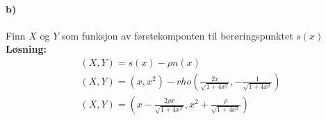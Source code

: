 \documentclass[11pt, A4paper,norsk]{article}
\begin{document}
		\paragraph{b)}
			\begin{flushleft}
Finn $X$ og $Y$ som funksjon av førstekomponten til berøringspunktet $s(x)$ \\
\vspace{1mm}
\textbf{Løsning:} \\
\vspace{1mm}
				\begin{align}
(X, Y) = s(x) - \rho n(x) \\
(X, Y) = (x, x^2) - rho (\frac{2x}{\sqrt{1 + 4x^2}}, - \frac{1}{\sqrt{1 + 4x^2}}) \\
(X, Y) = (x - \frac{2\rho x}{\sqrt{1 + 4x^2}}, x^2 + \frac{\rho}{\sqrt{1 + 4x^2}}) 
				\end{align}
			\end{flushleft}
\end{document}
